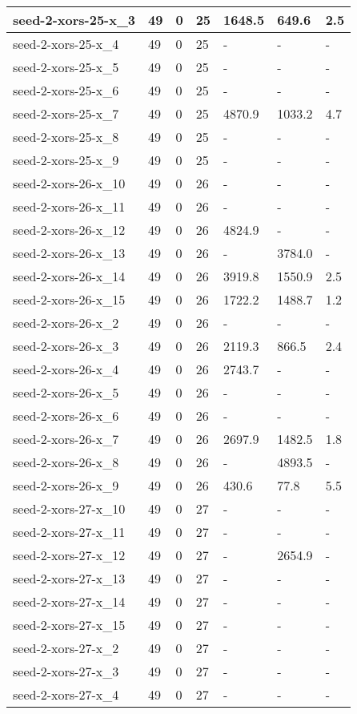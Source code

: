 \begin{scriptsize}
\begin{longtable}{|p{5cm}|l|l|l|l|l|l|}
seed-2-xors-25-x\_3&49&0&25&1648.5&649.6&2.5 \\ \hline 
seed-2-xors-25-x\_4&49&0&25&-&-&- \\ \hline 
seed-2-xors-25-x\_5&49&0&25&-&-&- \\ \hline 
seed-2-xors-25-x\_6&49&0&25&-&-&- \\ \hline 
seed-2-xors-25-x\_7&49&0&25&4870.9&1033.2&4.7 \\ \hline 
seed-2-xors-25-x\_8&49&0&25&-&-&- \\ \hline 
seed-2-xors-25-x\_9&49&0&25&-&-&- \\ \hline 
seed-2-xors-26-x\_10&49&0&26&-&-&- \\ \hline 
seed-2-xors-26-x\_11&49&0&26&-&-&- \\ \hline 
seed-2-xors-26-x\_12&49&0&26&4824.9&-&- \\ \hline 
seed-2-xors-26-x\_13&49&0&26&-&3784.0&- \\ \hline 
seed-2-xors-26-x\_14&49&0&26&3919.8&1550.9&2.5 \\ \hline 
seed-2-xors-26-x\_15&49&0&26&1722.2&1488.7&1.2 \\ \hline 
seed-2-xors-26-x\_2&49&0&26&-&-&- \\ \hline 
seed-2-xors-26-x\_3&49&0&26&2119.3&866.5&2.4 \\ \hline 
seed-2-xors-26-x\_4&49&0&26&2743.7&-&- \\ \hline 
seed-2-xors-26-x\_5&49&0&26&-&-&- \\ \hline 
seed-2-xors-26-x\_6&49&0&26&-&-&- \\ \hline 
seed-2-xors-26-x\_7&49&0&26&2697.9&1482.5&1.8 \\ \hline 
seed-2-xors-26-x\_8&49&0&26&-&4893.5&- \\ \hline 
seed-2-xors-26-x\_9&49&0&26&430.6&77.8&5.5 \\ \hline 
seed-2-xors-27-x\_10&49&0&27&-&-&- \\ \hline 
seed-2-xors-27-x\_11&49&0&27&-&-&- \\ \hline 
seed-2-xors-27-x\_12&49&0&27&-&2654.9&- \\ \hline 
seed-2-xors-27-x\_13&49&0&27&-&-&- \\ \hline 
seed-2-xors-27-x\_14&49&0&27&-&-&- \\ \hline 
seed-2-xors-27-x\_15&49&0&27&-&-&- \\ \hline 
seed-2-xors-27-x\_2&49&0&27&-&-&- \\ \hline 
seed-2-xors-27-x\_3&49&0&27&-&-&- \\ \hline 
seed-2-xors-27-x\_4&49&0&27&-&-&- \\ \hline 

\end{longtable}
\end{scriptsize}

